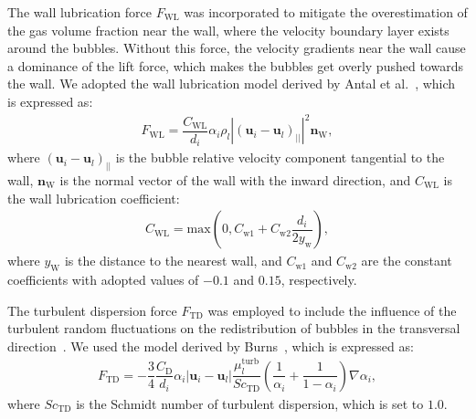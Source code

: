 \documentclass[3p, twocolumn, 10pt]{elsarticle}
\begin{document}
The wall lubrication force $F_{\mathrm{WL}}$ was incorporated to mitigate the overestimation of the gas volume fraction near the wall, where the velocity boundary layer exists around the bubbles.
Without this force, the velocity gradients near the wall cause a dominance of the lift force, which makes the bubbles get overly pushed towards the wall.
We adopted the wall lubrication model derived by Antal et al.~\cite{antalAnalysisPhaseDistribution1991}, which is expressed as:
\begin{align}
  F_{\mathrm{WL}} = 
  \dfrac{C_{\mathrm{WL}}}{d_{i}}
  \alpha_{i}\rho_{l}
  \left|
  \left(
  \bm{u}_{i}-\bm{u}_{l}
  \right)_{||}
  \right|^{2}\bm{n}_{\mathrm{W}},
\end{align}
where $\left(\bm{u}_{i}-\bm{u}_{l}\right)_{||}$ is the bubble relative velocity component tangential to the wall, $\bm{n}_{\mathrm{W}}$ is the normal vector of the wall with the inward direction, and $C_{\mathrm{WL}}$ is the wall lubrication coefficient:
\begin{align}
  C_{\mathrm{WL}} = \mathrm{max}
  \left(0, C_{\mathrm{w1}}+C_{\mathrm{w2}}\dfrac{d_{i}}{2y_{\mathrm{w}}}\right),
\end{align}
where $y_{\mathrm{W}}$ is the distance to the nearest wall, and $C_{\mathrm{w1}}$ and $C_{\mathrm{w2}}$ are the constant coefficients with adopted values of $-0.1$ and $0.15$, respectively.

The turbulent dispersion force $F_{\mathrm{TD}}$ was employed to include the influence of the turbulent random fluctuations on the redistribution of bubbles in the transversal direction~\cite{lubchenkoMoreFundamentalWall2018}.
We used the model derived by Burns~\cite{burnsTheFavreAveragedDrag2004}, which is expressed as:
\begin{align}
  F_{\mathrm{TD}}=-\dfrac{3}{4}
  \dfrac{C_{\mathrm{D}}}{d_{i}}
  \alpha_{i}
  \left|
  \bm{u}_{i}-\bm{u}_{l}
  \right|
  \dfrac{\mu_{l}^{\mathrm{turb}}}{Sc_{\mathrm{TD}}}
  \left(
  \dfrac{1}{\alpha_{i}}
  +\dfrac{1}{1-\alpha_{i}}
  \right)
  \nabla\alpha_{i},
\end{align}
where $Sc_{\mathrm{TD}}$ is the Schmidt number of turbulent dispersion, which is set to $1.0$. 
\end{document}
